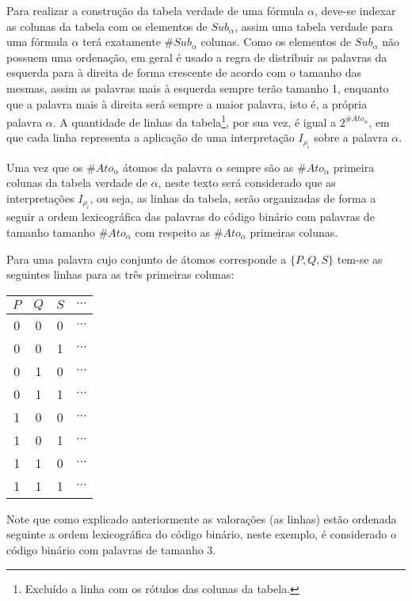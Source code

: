 Para realizar a construção da tabela verdade de uma fórmula $\alpha$, deve-se indexar as colunas da tabela com os elementos de $Sub_\alpha$, assim uma tabela verdade para uma fórmula $\alpha$ terá exatamente $\# Sub_\alpha$ colunas. Como os elementos de $Sub_\alpha$ não possuem uma ordenação, em geral é usado a regra de distribuir as palavras da esquerda para à direita de forma crescente de acordo com o tamanho das mesmas, assim as palavras mais à esquerda sempre terão tamanho 1, enquanto que a palavra mais à direita será sempre a maior palavra, isto é, a própria palavra $\alpha$.  A quantidade de linhas da tabela\footnote{Excluído a linha com os rótulos das colunas da tabela.}, por sua vez, é igual a $2^{\# Ato_\alpha}$, em que cada linha representa a aplicação de uma interpretação $I_{\rho_i}$ sobre a palavra $\alpha$.

Uma vez que os $\# Ato_\alpha$ átomos da palavra $\alpha$ sempre são as $\# Ato_\alpha$ primeira colunas da tabela verdade de $\alpha$, neste texto será considerado que as interpretações $I_{\rho_i}$, ou seja, as linhas da tabela, serão organizadas de forma a seguir a ordem lexicográfica das palavras do código binário com palavras de tamanho tamanho $\# Ato_\alpha$ com respeito as $\# Ato_\alpha$ primeiras colunas. 

\begin{exem}
    Para uma palavra cujo conjunto de átomos corresponde a $\{P, Q, S\}$ tem-se as seguintes linhas para as três primeiras colunas:
    \begin{table*}[ht]
        \centering
        \scriptsize
        \begin{tabular}{|c|c|c|c}
             \hline
             $P$ & $Q$ & $S$ & $\cdots$ \\
             \hline
             0 & 0 & 0 & $\cdots$ \\
             \hline
             0 & 0 & 1 & $\cdots$ \\
             \hline
             0 & 1 & 0 & $\cdots$ \\
             \hline
             0 & 1 & 1 & $\cdots$ \\
             \hline
             1 & 0 & 0 & $\cdots$ \\
             \hline
             1 & 0 & 1 & $\cdots$ \\
             \hline
             1 & 1 & 0 & $\cdots$ \\
             \hline
             1 & 1 & 1 & $\cdots$ \\
             \hline
        \end{tabular}
    \end{table*}
    Note que como explicado anteriormente as valorações (as linhas) estão ordenada seguinte a ordem lexicográfica do código binário, neste exemplo, é considerado o código binário com palavras de tamanho $3$.
\end{exem}
    

